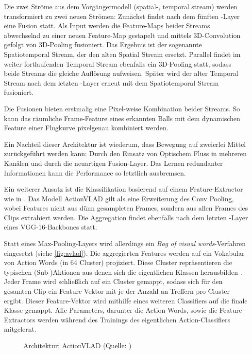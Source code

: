 Die zwei Ströme aus dem Vorgängermodell (spatial-, temporal stream) werden transformiert zu zwei neuen Strömen:
Zunächst findet nach dem fünften \conv-Layer eine Fusion statt.
Als Input werden die Feature-Maps beider Streams abwechselnd zu einer neuen Feature-Map gestapelt und mittels 3D-Convolution gefolgt von 3D-Pooling fusioniert.
Das Ergebnis ist der sogenannte Spatiotemporal Stream, der den alten Spatial Stream ersetzt.
Parallel findet im weiter fortlaufenden Temporal Stream ebenfalls ein 3D-Pooling statt, sodass beide Streams die gleiche Auflösung aufweisen.
Später wird der alter Temporal Stream nach dem letzten \fc-Layer erneut mit dem Spatiotemporal Stream fusioniert.

Die Fusionen bieten erstmalig eine Pixel-weise Kombination beider Streams.
So kann \zB das räumliche Frame-Feature eines erkannten Balls mit dem dynamischen Feature einer Flugkurve pixelgenau kombiniert werden.

Ein Nachteil dieser Architektur ist wiederum, dass Bewegung auf zweierlei Mittel zurückgeführt werden kann:
Durch den Einsatz von Optischem Fluss in mehreren Kanälen und durch die neuartigen Fusion-Layer.
Das Lernen redundanter Informationen kann die Performance so letztlich ausbremsen.

Ein weiterer Ansatz ist die Klassifikation basierend auf einem Feature-Extractor wie in \cite{Girdhar17}.
Das Modell ActionVLAD gilt als eine Erweiterung des Conv Pooling, wobei Features nicht aus dünn gesampleten Frames, sondern aus allen Frames des Clips extrahiert werden.
Die Aggregation findet ebenfalls nach dem letzten \conv-Layer eines VGG-16-Backbones statt.

Statt eines Max-Pooling-Layers wird allerdings ein \emph{Bag of visual words}-Verfahren eingesetzt (siehe \autoref{fig:avlad}).
Die aggregierten Features werden auf ein Vokabular von Action Words (in 64 Cluster) projiziert.
Diese Cluster repräsentieren die typischen (Sub-)Aktionen aus denen sich die eigentlichen Klassen herausbilden \cite{Ghosh18}.
Jeder Frame wird schließlich auf ein Cluster gemappt, sodass sich für den gesamten Clip ein Feature-Vektor mit je der Anzahl an Treffern pro Cluster ergibt.
Dieser Feature-Vektor wird mithilfe eines weiteren Classifiers auf die finale Klasse gemappt.
Alle Parameters, darunter die Action Words, sowie die Feature Extractors werden während des Trainings des eigentlichen Action-Classifiers mitgelernt.

\begin{figure}[h!]
    \centering
    \caption{Architektur: ActionVLAD (Quelle: \cite{Girdhar17})}
    \label{fig:avlad}
\end{figure}

